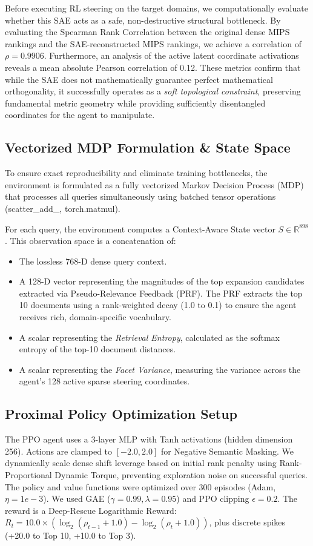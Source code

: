 Before executing RL steering on the target domains, we computationally evaluate whether this SAE acts as a safe, non-destructive structural bottleneck. By evaluating the Spearman Rank Correlation between the original dense MIPS rankings and the SAE-reconstructed MIPS rankings, we achieve a correlation of $\rho = 0.9906$. Furthermore, an analysis of the active latent coordinate activations reveals a mean absolute Pearson correlation of 0.12. These metrics confirm that while the SAE does not mathematically guarantee perfect mathematical orthogonality, it successfully operates as a \textit{soft topological constraint}, preserving fundamental metric geometry while providing sufficiently disentangled coordinates for the agent to manipulate.

\subsection{Vectorized MDP Formulation \& State Space}
To ensure exact reproducibility and eliminate training bottlenecks, the environment is formulated as a fully vectorized Markov Decision Process (MDP) that processes all queries simultaneously using batched tensor operations (scatter\_add\_, torch.matmul).

For each query, the environment computes a Context-Aware State vector $S \in \mathbb{R}^{898}$. This observation space is a concatenation of:
\begin{itemize}
    \item The lossless 768-D dense query context.
    \item A 128-D vector representing the magnitudes of the top expansion candidates extracted via Pseudo-Relevance Feedback (PRF). The PRF extracts the top 10 documents using a rank-weighted decay (1.0 to 0.1) to ensure the agent receives rich, domain-specific vocabulary.
    \item A scalar representing the \textit{Retrieval Entropy}, calculated as the softmax entropy of the top-10 document distances.
    \item A scalar representing the \textit{Facet Variance}, measuring the variance across the agent's 128 active sparse steering coordinates.
\end{itemize}

\subsection{Proximal Policy Optimization Setup}
The PPO agent uses a 3-layer MLP with Tanh activations (hidden dimension 256). Actions are clamped to $[-2.0, 2.0]$ for Negative Semantic Masking. We dynamically scale dense shift leverage based on initial rank penalty using Rank-Proportional Dynamic Torque, preventing exploration noise on successful queries. The policy and value functions were optimized over 300 episodes (Adam, $\eta=1e-3$). We used GAE ($\gamma=0.99, \lambda=0.95$) and PPO clipping $\epsilon=0.2$. The reward is a Deep-Rescue Logarithmic Reward: $R_t = 10.0 \times (\log_2(\rho_{t-1} + 1.0) - \log_2(\rho_t + 1.0))$, plus discrete spikes (+20.0 to Top 10, +10.0 to Top 3).


